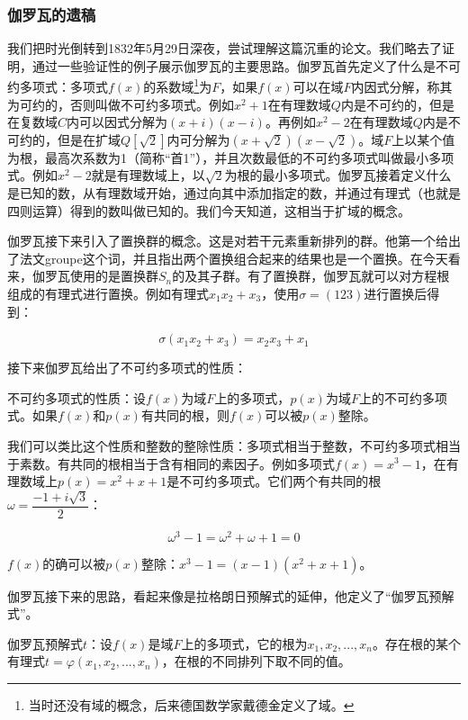 \documentclass[b5paper]{ctexart}
\begin{document}
\subsubsection{伽罗瓦的遗稿}
 

我们把时光倒转到1832年5月29日深夜，尝试理解这篇沉重的论文。我们略去了证明，通过一些验证性的例子展示伽罗瓦的主要思路。伽罗瓦首先定义了什么是不可约多项式：多项式$f(x)$的系数域\footnote{当时还没有域的概念，后来德国数学家戴德金定义了域。}为$F$，如果$f(x)$可以在域$F$内因式分解，称其为可约的，否则叫做不可约多项式。例如$x^2 + 1$在有理数域$Q$内是不可约的，但是在复数域$C$内可以因式分解为$(x + i)(x - i)$。再例如$x^2 - 2$在有理数域$Q$内是不可约的，但是在扩域$Q[\sqrt{2}]$内可分解为$(x + \sqrt{2})(x - \sqrt{2})$。域$F$上以某个值为根，最高次系数为1（简称“首1”），并且次数最低的不可约多项式叫做最小多项式。例如$x^2 - 2$就是有理数域上，以$\sqrt{2}$为根的最小多项式。伽罗瓦接着定义什么是已知的数，从有理数域开始，通过向其中添加指定的数，并通过有理式（也就是四则运算）得到的数叫做已知的。我们今天知道，这相当于扩域的概念。

伽罗瓦接下来引入了置换群的概念。这是对若干元素重新排列的群。他第一个给出了法文groupe这个词，并且指出两个置换组合起来的结果也是一个置换。在今天看来，伽罗瓦使用的是置换群$S_n$的及其子群。有了置换群，伽罗瓦就可以对方程根组成的有理式进行置换。例如有理式$x_1 x_2 + x_3$，使用$\sigma = (123)$进行置换后得到：

\[
\sigma(x_1 x_2 + x_3) = x_2 x_3 + x_1
\]

接下来伽罗瓦给出了不可约多项式的性质：

\begin{lemma}不可约多项式的性质：设$f(x)$为域$F$上的多项式，$p(x)$为域$F$上的不可约多项式。如果$f(x)$和$p(x)$有共同的根，则$f(x)$可以被$p(x)$整除。
\end{lemma}

我们可以类比这个性质和整数的整除性质：多项式相当于整数，不可约多项式相当于素数。有共同的根相当于含有相同的素因子。例如多项式$f(x) = x^3 - 1$，在有理数域上$p(x) = x^2 + x + 1$是不可约多项式。它们两个有共同的根$\omega = \dfrac{-1 + i\sqrt{3}}{2}$：

\[
\omega^3 - 1 = \omega^2 + \omega + 1 = 0
\]

$f(x)$的确可以被$p(x)$整除：$x^3 - 1 = (x - 1)(x^2 + x + 1)$。

伽罗瓦接下来的思路，看起来像是拉格朗日预解式的延伸，他定义了“伽罗瓦预解式”。

\begin{lemma}伽罗瓦预解式$t$：设$f(x)$是域$F$上的多项式，它的根为$x_1, x_2, ..., x_n$。存在根的某个有理式$t = \varphi(x_1, x_2, ..., x_n)$，在根的不同排列下取不同的值。
\end{lemma}
\end{document}
